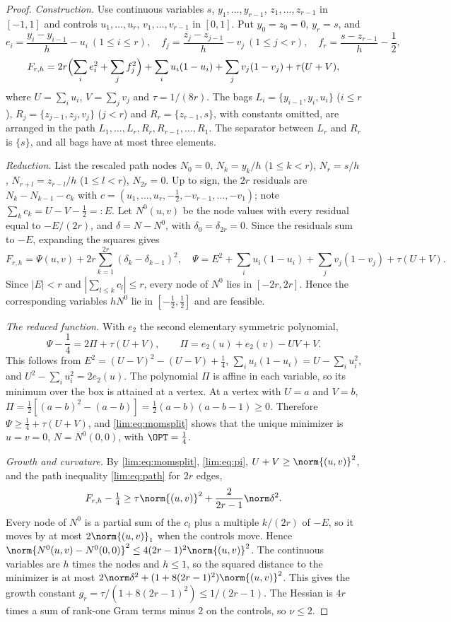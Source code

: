 \begin{proof}
\emph{Construction.} Use continuous variables $s$, $y_1,\ldots,y_{r-1}$,
$z_1,\ldots,z_{r-1}$ in $[-1,1]$ and controls $u_1,\ldots,u_r$,
$v_1,\ldots,v_{r-1}$ in $[0,1]$. Put $y_0=z_0=0$, $y_r=s$, and
\[
e_i=\frac{y_i-y_{i-1}}h-u_i\ (1\le i\le r),\quad
f_j=\frac{z_j-z_{j-1}}h-v_j\ (1\le j<r),\quad
f_r=\frac{s-z_{r-1}}h-\frac12,
\]
\[
F_{r,h}=2r\Bigl(\sum_ie_i^2+\sum_jf_j^2\Bigr)+\sum_iu_i(1-u_i)
+\sum_jv_j(1-v_j)+\tau(U+V),
\]
where $U=\sum_iu_i$, $V=\sum_jv_j$ and $\tau=1/(8r)$. The bags
$L_i=\{y_{i-1},y_i,u_i\}$ ($i\le r$), $R_j=\{z_{j-1},z_j,v_j\}$ ($j<r$) and
$R_r=\{z_{r-1},s\}$, with constants omitted, are arranged in the path
$L_1,\ldots,L_r,R_r,R_{r-1},\ldots,R_1$. The separator between $L_r$ and
$R_r$ is $\{s\}$, and all bags have at most three elements.

\emph{Reduction.} List the rescaled path nodes $N_0=0$, $N_k=y_k/h$
($1\le k<r$), $N_r=s/h$, $N_{r+l}=z_{r-l}/h$ ($1\le l<r$), $N_{2r}=0$. Up to
sign, the $2r$ residuals are $N_k-N_{k-1}-c_k$ with
$c=(u_1,\ldots,u_r,-\frac12,-v_{r-1},\ldots,-v_1)$; note
$\sum_kc_k=U-V-\frac12=:E$. Let $N^0(u,v)$ be the node values with every
residual equal to $-E/(2r)$, and $\delta=N-N^0$, with $\delta_0=\delta_{2r}=0$.
Since the residuals sum to $-E$, expanding the squares gives
\begin{equation}\label{lim:eq:momsplit}
F_{r,h}=\Psi(u,v)+2r\sum_{k=1}^{2r}(\delta_k-\delta_{k-1})^2,\quad
\Psi=E^2+\sum_iu_i(1-u_i)+\sum_jv_j(1-v_j)+\tau(U+V).
\end{equation}
Since $|E|<r$ and $|\sum_{l\le k}c_l|\le r$, every node of $N^0$ lies in
$[-2r,2r]$. Hence the corresponding variables $hN^0$ lie in
$[-\tfrac12,\tfrac12]$ and are feasible.

\emph{The reduced function.} With $e_2$ the second elementary symmetric
polynomial,
\begin{equation}\label{lim:eq:pi}
\Psi-\frac14=2\Pi+\tau(U+V),\qquad\Pi=e_2(u)+e_2(v)-UV+V .
\end{equation}
This follows from $E^2=(U-V)^2-(U-V)+\frac14$, $\sum_iu_i(1-u_i)=U-\sum_iu_i^2$,
and $U^2-\sum_iu_i^2=2e_2(u)$. The polynomial $\Pi$ is affine in each
variable, so its minimum over the box is attained at a vertex. At a vertex
with $U=a$ and $V=b$,
$\Pi=\frac12[(a-b)^2-(a-b)]=\frac12(a-b)(a-b-1)\ge0$. Therefore $\Psi\ge
\frac14+\tau(U+V)$, and \eqref{lim:eq:momsplit} shows that the unique
minimizer is $u=v=0$, $N=N^0(0,0)$, with $\OPT=\frac14$.

\emph{Growth and curvature.} By \eqref{lim:eq:momsplit}, \eqref{lim:eq:pi},
$U+V\ge\norm{(u,v)}^2$, and the path inequality \eqref{lim:eq:path} for
$2r$ edges,
\[
F_{r,h}-\tfrac14\ge\tau\norm{(u,v)}^2+\frac2{2r-1}\norm\delta^2 .
\]
Every node of $N^0$ is a partial sum of the $c_l$ plus a multiple $k/(2r)$
of $-E$, so it moves by at most $2\norm{(u,v)}_1$ when the controls move.
Hence $\norm{N^0(u,v)-N^0(0,0)}^2\le4(2r-1)^2\norm{(u,v)}^2$. The continuous
variables are $h$ times the nodes and $h\le1$, so the squared distance to the
minimizer is at most $2\norm\delta^2+(1+8(2r-1)^2)\norm{(u,v)}^2$. This gives
the growth constant $g_r=\tau/(1+8(2r-1)^2)\le1/(2r-1)$. The Hessian is $4r$
times a sum of rank-one Gram terms minus $2$ on the controls, so $\nu\le2$.


\end{proof}
